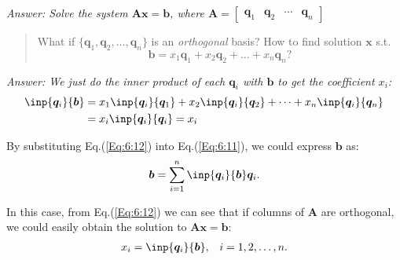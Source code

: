 \emph{Answer: Solve the system $\bm{Ax}=\bm b$, where $\bm A=\begin{bmatrix}
\bm q_1&\bm q_2&\cdots&\bm q_n
\end{bmatrix}$} 
\begin{quotation}
What if $\{\bm q_1,\bm q_2,\dots,\bm q_n\}$ is an \emph{orthogonal} basis? How to find solution $\bm x$ s.t. 
\begin{equation}\label{Eq:6:11}
\bm b=x_1\bm q_1+x_2\bm q_2+\dots+x_n\bm q_n?
\end{equation}
\end{quotation}

\emph{Answer: We just do the inner product of each $\bm q_i$ with $\bm b$ to get the coefficient $x_i$:}
\begin{equation}
\begin{aligned}
\inp{\bm q_i}{\bm b}&=x_1\inp{\bm q_i}{\bm q_1}+x_2\inp{\bm q_i}{\bm q_2}+\dots+x_n\inp{\bm q_i}{\bm q_n}\\
&=x_i\inp{\bm q_i}{\bm q_i}=x_i
\end{aligned}\label{Eq:6:12}
\end{equation}

By substituting Eq.(\ref{Eq:6:12}) into Eq.(\ref{Eq:6:11}), we could express $\bm b$ as:
\[
\bm b=\sum_{i=1}^{n}\inp{\bm q_i}{\bm b}\bm q_i.
\]

In this case, from Eq.(\ref{Eq:6:12}) we can see that if columns of $\bm A$ are orthogonal, we could easily obtain the solution to $\bm{Ax}=\bm b$:
\[\begin{array}{ll}
x_i=\inp{\bm q_i}{\bm b},
&
i=1,2,\dots,n.
\end{array}
\]

